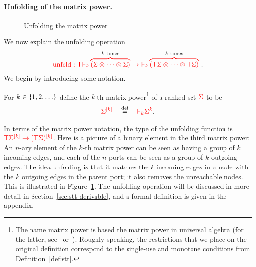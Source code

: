 \paragraph*{Unfolding of the matrix power.}

\begin{figure}[]
    \caption{Unfolding the matrix power}
    \label{fig:unfold}
\end{figure}
We now explain the unfolding operation 
\begin{align*}
    \ranked{\unfold : \tmonad \reduce k \overbrace{(\rSigma \otimes \cdots \otimes \rSigma)}^{\black{\text{$k$ times}}} \to  \reduce k \overbrace{(\tmonad\rSigma \otimes \cdots \otimes \tmonad\rSigma)}^{\black{\text{$k$ times}}}\ }.
    \end{align*}
We begin by introducing some notation.

\begin{definition}
     For $k \in \set{1,2,\ldots}$ define the $k$-th matrix power\footnote{
        The name  matrix power is based the matrix power in  universal algebra (for the latter, see~\cite{Taylor1975} or~\cite{szendrei1990simple}). Roughly speaking, the restrictions that we place on the original definition correspond to the single-use and monotone conditions from Definition~\ref{def:stt}. 
     } of a ranked set $\rSigma$ 
to be 
\begin{align*}
 \mati k \rSigma \quad \eqdef \quad \ranked{\reduce k \rSigma^k}.
\end{align*}
\end{definition}
In terms of the matrix power notation, the type of the unfolding function is $\ranked{\tmonad \mati k{\Sigma} \to \mati k{( \tmonad \Sigma)}}$. 
Here is a picture of a  binary element in the third matrix power:
An $n$-ary  element of the $k$-th matrix power  can be seen as having a group of $k$ incoming edges, and each of the $n$ ports can be seen as a group of $k$ outgoing edges. The idea  unfolding  is that it matches the $k$ incoming edges in a node with the $k$ outgoing edges in the parent port; it also removes the unreachable nodes. This is illustrated in Figure~\ref{fig:unfold}. The unfolding operation will be discussed in more detail in Section~\ref{sec:stt-derivable}, and a formal definition is given in the appendix.



